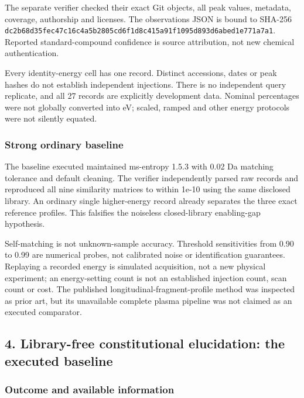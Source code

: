 \documentclass[
  10pt,
]{article}
\begin{document}
The separate verifier checked their exact Git objects, all peak values,
metadata, coverage, authorship and licenses. The observations JSON is
bound to SHA-256
\nolinkurl{dc2b68d35fec47c16c4a5b2805cd6f1d8c415a91f1095d893d6abed1e771a7a1}.
Reported standard-compound confidence is source attribution, not new
chemical authentication.

Every identity-energy cell has one record. Distinct accessions, dates or
peak hashes do not establish independent injections. There is no
independent query replicate, and all 27 records are explicitly
development data. Nominal percentages were not globally converted into
eV; scaled, ramped and other energy protocols were not silently equated.

\hypertarget{strong-ordinary-baseline}{%
\subsubsection{Strong ordinary
baseline}\label{strong-ordinary-baseline}}

The baseline executed maintained ms-entropy 1.5.3 with 0.02 Da matching
tolerance and default cleaning. The verifier independently parsed raw
records and reproduced all nine similarity matrices to within 1e-10
using the same disclosed library. An ordinary single higher-energy
record already separates the three exact reference profiles. This
falsifies the noiseless closed-library enabling-gap hypothesis.

Self-matching is not unknown-sample accuracy. Threshold sensitivities
from 0.90 to 0.99 are numerical probes, not calibrated noise or
identification guarantees. Replaying a recorded energy is simulated
acquisition, not a new physical experiment; an energy-setting count is
not an established injection count, scan count or cost. The published
longitudinal-fragment-profile method was inspected as prior art, but its
unavailable complete plasma pipeline was not claimed as an executed
comparator.

\hypertarget{library-free-constitutional-elucidation-the-executed-baseline}{%
\subsection{4. Library-free constitutional elucidation: the executed
baseline}\label{library-free-constitutional-elucidation-the-executed-baseline}}

\hypertarget{outcome-and-available-information}{%
\subsubsection{Outcome and available
information}\label{outcome-and-available-information}}
\end{document}
